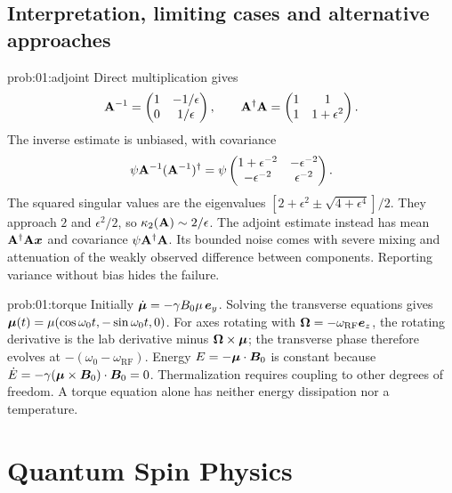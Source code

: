 \subsection{Interpretation, limiting cases and alternative approaches}
\begin{solution}{prob:01:adjoint}
Direct multiplication gives
\[
 \mathbf{A}^{-1}=\begin{pmatrix}1&-1/\epsilon\\0&1/\epsilon\end{pmatrix},
 \qquad
 \mathbf{A}^\dagger\mathbf{A}=\begin{pmatrix}1&1\\1&1+\epsilon^2\end{pmatrix}.
\]
The inverse estimate is unbiased, with covariance
\[
 \psi\mathbf{A}^{-1}(\mathbf{A}^{-1})^\dagger
 =\psi\begin{pmatrix}1+\epsilon^{-2}&-\epsilon^{-2}\\
 -\epsilon^{-2}&\epsilon^{-2}\end{pmatrix}.
\]
The squared singular values are the eigenvalues
\([2+\epsilon^2\pm\sqrt{4+\epsilon^4}]/2\).
They approach \(2\) and \(\epsilon^2/2\), so
\(\kappa_2(\mathbf{A})\sim2/\epsilon\).
The adjoint estimate instead has mean \(\mathbf{A}^\dagger\mathbf{A}\bm{x}\) and covariance \(\psi\mathbf{A}^\dagger\mathbf{A}\). Its bounded noise comes with severe mixing and attenuation of the weakly observed difference between components. Reporting variance without bias hides the failure.
\end{solution}
\begin{solution}{prob:01:torque}
Initially \(\dot{\bm{\mu}}=-\gamma B_0\mu\,\bm{e}_y\).
Solving the transverse equations gives
\(\bm{\mu}(t)=\mu(\cos\omega_0t,-\sin\omega_0t,0)\).
For axes rotating with \(\bm{\Omega}=-\omega_{\mathrm{RF}}\bm{e}_z\), the rotating derivative is the lab derivative minus \(\bm{\Omega}\times\bm{\mu}\); the transverse phase therefore evolves at \(-(\omega_0-\omega_{\mathrm{RF}})\).
Energy \(E=-\bm{\mu}\cdot\bm{B}_0\) is constant because
\(\dot E=-\gamma(\bm{\mu}\times\bm{B}_0)\cdot\bm{B}_0=0\).
Thermalization requires coupling to other degrees of freedom. A torque equation alone has neither energy dissipation nor a temperature.
\end{solution}

\section{Quantum Spin Physics}
\label{sec:e:quantum-spin-physics}
